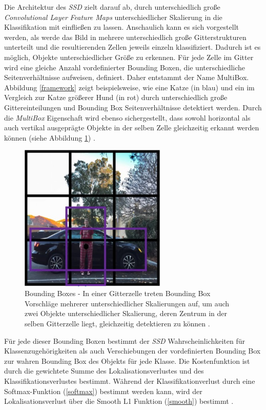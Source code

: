 Die Architektur des \textit{SSD} zielt darauf ab, durch unterschiedlich große \textit{Convolutional Layer} \textit{Feature Maps} unterschiedlicher Skalierung in die Klassifikation mit einfließen zu lassen. Anschaulich kann es sich vorgestellt werden, als werde das Bild in mehrere unterschiedlich große Gitterstrukturen unterteilt und die resultierenden Zellen jeweils einzeln klassifiziert. Dadurch ist es möglich, Objekte unterschiedlicher Größe zu erkennen. Für jede Zelle im Gitter wird eine gleiche Anzahl vordefinierter Bounding Boxen, die unterschiedliche Seitenverhältnisse aufweisen, definiert. Daher entstammt der Name \glqq MultiBox\grqq{}. Abbildung \ref{framework} zeigt beispielsweise, wie eine Katze (in blau) und ein im Vergleich zur Katze größerer Hund (in rot) durch unterschiedlich große Gittereinteilungen und Bounding Box Seitenverhältnisse detektiert werden. Durch die \textit{MultiBox} Eigenschaft wird ebenso sichergestellt, dass sowohl horizontal als auch vertikal ausgeprägte Objekte in der selben Zelle gleichzeitig erkannt werden können (siehe Abbildung \ref{boundingboxes}) \cite{ssd.20161229}.

\begin{figure}[H]
	\begin{center}
		\includegraphics[width=7cm]{Bilder/bounding_boxes.png} 
		\caption[Bounding Boxes]{Bounding Boxes - In einer Gitterzelle treten Bounding Box Vorschläge mehrerer unterschiedlicher Skalierungen auf, um auch zwei Objekte unterschiedlicher Skalierung, deren Zentrum in der selben Gitterzelle liegt, gleichzeitig detektieren zu können \cite{AndrewNg.2019}.}
		\label{boundingboxes}
	\end{center}
\end{figure}

Für jede dieser Bounding Boxen bestimmt der \textit{SSD} Wahrscheinlichkeiten für Klassenzugehörigkeiten als auch Verschiebungen der vordefinierten Bounding Box zur wahren Bounding Box des Objekts für jede Klasse. Die Kostenfunktion ist durch die gewichtete Summe des Lokalisationsverlustes und des Klassifikationsverlustes bestimmt. Während der Klassifikationverlust durch eine Softmax-Funktion (\ref{softmax}) bestimmt werden kann, wird der Lokalisationsverlust über die Smooth L1 Funktion (\ref{smooth}) bestimmt \cite{ssd.20161229}.

